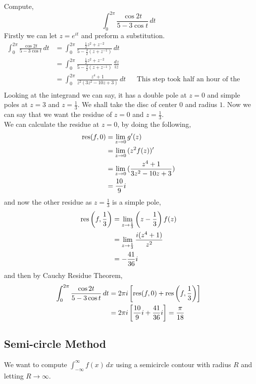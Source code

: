 \documentclass{article}
\begin{document}
\begin{eg}
  Compute,
  $$ \int_0^{2\pi} {\frac{\cos 2t}{5 - 3\cos t}\,dt} $$
  Firstly we can let $z = e^{it}$ and preform a substitution.
  \begin{align*}
    \int_0^{2\pi} {\frac{\cos 2t}{5 - 3\cos t}\,dt} &= \int_0^{2\pi} {\frac{\frac{1}{2}z^2 + z^{-2}}{5 - \frac{3}{2}(z + z^{-1})}}\,dt\\
    &= \int_0^{2\pi} {\frac{\frac{1}{2}z^2 + z^{-2}}{5 - \frac{3}{2}(z + z^{-1})}}\,\frac{dz}{iz}\\
    &= \int_0^{2\pi} {\frac{z^4 + 1}{z^2 (3z^2 - 10z + 3)}}\,dt && \text{This step took half an hour of the lecture}\\
  \end{align*}
  Looking at the integrand we can say, it has a double pole at $z = 0$ and simple poles at $z = 3$ and $z = \frac{1}{3}$. We shall take the disc of center 0 and radius $1$. Now we can say that we want the residue of $z = 0$ and $z = \frac{1}{3}$.\\

  We can calculate the residue at $z = 0$, by doing the following,
  \begin{align*}
    \operatorname*{res} (f, 0) &= \lim_{z \to 0} {g'(z)}\\
    &= \lim_{z \to 0 } { (z^2 f(z))'}\\
    &= \lim_{z \to 0} {(\frac{z^4 + 1}{3z^2 - 10z + 3})}\\
    &= \frac{10}{9}i
  \end{align*}
  and now the other residue as $z = \frac{1}{3}$ is a simple pole,
  \begin{align*}
    \operatorname*{res} \left(f, \frac{1}{3}\right) &= \lim_{z \to \frac{1}{3}} { \left(z - \frac{1}{3}\right)f(z)}\\
    &= \lim_{z \to \frac{1}{3}} {\frac{i(z^4 + 1)}{z^2}}\\
    &= -\frac{41}{36}i
  \end{align*}
  and then by Cauchy Residue Theorem,
  \begin{align*}
    \int_0^{2\pi} {\frac{\cos 2t}{5 - 3\cos t}\,dt} &= 2\pi i \left[ \operatorname*{res} (f, 0) + \operatorname*{res} \left( f, \frac{1}{3} \right) \right]\\
    &= 2\pi i \left[ \frac{10}{9}i + \frac{41}{36}i \right] = \frac{\pi}{18}
  \end{align*}
\end{eg}

\subsection{Semi-circle Method}
We want to compute $\displaystyle{\int_{-\infty}^\infty f(x)\,dx}$ using a semicircle contour with radius $R$ and letting $R \to \infty$.
\end{document}
